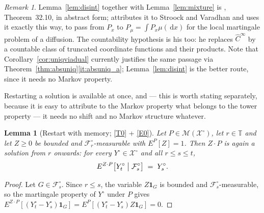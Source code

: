 \documentclass[11pt,a4paper]{article}
\theoremstyle{plain}
\newtheorem{lemma}[theorem]{Lemma}
\theoremstyle{definition}
\theoremstyle{remark}
\newtheorem{remark}[theorem]{Remark}
\newcommand{\T}{\mathbb{T}}                     %
\newcommand{\Filt}{\mathcal{F}}
\newcommand{\XX}{\mathcal{X}}                  %
\newcommand{\Msol}{\mathcal{M}}
\newcommand{\one}{\mathbf{1}}
\newcommand{\dif}{\,\mathrm{d}}
\newcommand{\KA}{\cite{Kal21}}
\begin{document}
\begin{remark}
  \label{rem:disintkall}
  Lemma~\ref{lem:disint} together with Lemma~\ref{lem:mixture} is
  \KA, Theorem~32.10, in abstract form; \KA{} attributes it to Stroock and
  Varadhan and uses it exactly this way, to pass from $P_x$ to
  $P_\mu = \int P_x \mu(\dif x)$ for the local martingale problem of a diffusion.
  The countability hypothesis is his too: he replaces $\hat{C}^\infty$ by a
  countable class of truncated coordinate functions and their products.  Note
  that Corollary~\ref{cor:uniqviadual} currently justifies the same passage via
  Theorem~\ref{thm:absuniq}\ref{it:absuniq_a}; Lemma~\ref{lem:disint} is the
  better route, since it needs no Markov property.
\end{remark}

Restarting a solution is available at once, and --- this is worth stating
separately, because it is easy to attribute to the Markov property what belongs
to the tower property --- it needs no shift and no Markov structure whatever.

\begin{lemma}[Restart with memory; \eqref{T0} + \eqref{E0}]
  \label{lem:restartmemory}
  Let $P \in \Msol(\XX^\circ)$, let $r \in \T$ and let $Z \geq 0$ be bounded and
  $\Filt^\circ_r$-measurable with $E^P[Z] = 1$.  Then $Z \cdot P$ is again a
  solution \emph{from $r$ onwards}: for every $Y^\circ \in \XX^\circ$ and all
  $r \leq s \leq t$,
  \[
    E^{Z \cdot P}\bigl[ Y^\circ_t \bigm| \Filt^\circ_s \bigr] \;=\; Y^\circ_s .
  \]
\end{lemma}

\begin{proof}
  Let $G \in \Filt^\circ_s$.  Since $r \leq s$, the variable $Z \one_G$ is bounded
  and $\Filt^\circ_s$-measurable, so the martingale property of $Y^\circ$ under
  $P$ gives
  $E^{Z \cdot P}[(Y^\circ_t - Y^\circ_s)\one_G] = E^P[(Y^\circ_t - Y^\circ_s) Z \one_G] = 0$.
\end{proof}
\end{document}
